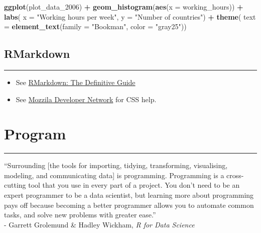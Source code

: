 \documentclass[
]{book}
\newenvironment{Shaded}{\begin{snugshade}}{\end{snugshade}}
\newcommand{\DataTypeTok}[1]{\textcolor[rgb]{0.13,0.29,0.53}{#1}}
\newcommand{\DecValTok}[1]{\textcolor[rgb]{0.00,0.00,0.81}{#1}}
\newcommand{\KeywordTok}[1]{\textcolor[rgb]{0.13,0.29,0.53}{\textbf{#1}}}
\newcommand{\NormalTok}[1]{#1}
\newcommand{\OperatorTok}[1]{\textcolor[rgb]{0.81,0.36,0.00}{\textbf{#1}}}
\newcommand{\StringTok}[1]{\textcolor[rgb]{0.31,0.60,0.02}{#1}}
\providecommand{\tightlist}{%
  \setlength{\itemsep}{0pt}\setlength{\parskip}{0pt}}
\begin{document}
\begin{Shaded}
\begin{Highlighting}[]
\KeywordTok{ggplot}\NormalTok{(plot_data_}\DecValTok{2006}\NormalTok{) }\OperatorTok{+}
\StringTok{  }\KeywordTok{geom_histogram}\NormalTok{(}\KeywordTok{aes}\NormalTok{(}\DataTypeTok{x =}\NormalTok{ working_hours)) }\OperatorTok{+}
\StringTok{  }\KeywordTok{labs}\NormalTok{(}
    \DataTypeTok{x =} \StringTok{"Working hours per week"}\NormalTok{,}
    \DataTypeTok{y =} \StringTok{"Number of countries"}\NormalTok{) }\OperatorTok{+}
\StringTok{  }\KeywordTok{theme}\NormalTok{(}
    \DataTypeTok{text =} \KeywordTok{element_text}\NormalTok{(}\DataTypeTok{family =} \StringTok{"Bookman"}\NormalTok{, }\DataTypeTok{color =} \StringTok{"gray25"}\NormalTok{))}
\end{Highlighting}
\end{Shaded}

\hypertarget{rmarkdown}{%
\section{RMarkdown}\label{rmarkdown}}

\begin{center}\rule{0.5\linewidth}{0.5pt}\end{center}

\begin{itemize}
\tightlist
\item
  See \href{https://bookdown.org/yihui/rmarkdown/}{RMarkdown: The Definitive Guide}
\item
  See \href{https://developer.mozilla.org/en-US/docs/Web/CSS/CSS_Selectors}{Mozzila Developer Network} for CSS help.
\end{itemize}

\hypertarget{program}{%
\chapter{Program}\label{program}}

\begin{center}\rule{0.5\linewidth}{0.5pt}\end{center}

``Surrounding {[}the tools for importing, tidying, transforming, visualising, modeling, and communicating data{]} is programming. Programming is a cross-cutting tool that you use in every part of a project. You don't need to be an expert programmer to be a data scientist, but learning more about programming pays off because becoming a better programmer allows you to automate common tasks, and solve new problems with greater ease.''\\
- Garrett Grolemund \& Hadley Wickham, \emph{R for Data Science}
\end{document}
